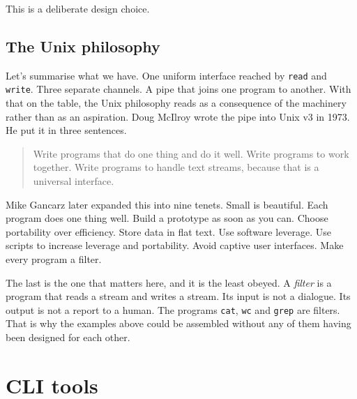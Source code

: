 \documentclass[11pt,a4paper]{article}
\begin{document}
This is a deliberate design choice.

\subsection{The Unix philosophy}

Let's summarise what we have. One uniform interface reached by \texttt{read} and \texttt{write}.
Three separate channels. A pipe that joins one program to another. With that on the table, the Unix
philosophy reads as a consequence of the machinery rather than as an aspiration. Doug McIlroy wrote
the pipe into Unix v3 in 1973. He put it in three sentences.

\begin{quote}
Write programs that do one thing and do it well. Write programs to work together. Write
programs to handle text streams, because that is a universal interface.
\end{quote}

Mike Gancarz later expanded this into nine tenets. Small is beautiful. Each program does one
thing well. Build a prototype as soon as you can. Choose portability over efficiency. Store data in
flat text. Use software leverage. Use scripts to increase leverage and portability. Avoid captive
user interfaces. Make every program a filter.

The last is the one that matters here, and it is the least obeyed. A \emph{filter} is a program
that reads a stream and writes a stream. Its input is not a dialogue. Its output is not a report to
a human. The programs \texttt{cat}, \texttt{wc} and \texttt{grep} are filters. That is why the examples above
could be assembled without any of them having been designed for each other.

\newpage

\section{CLI tools}
\label{sec:cli}
\end{document}
